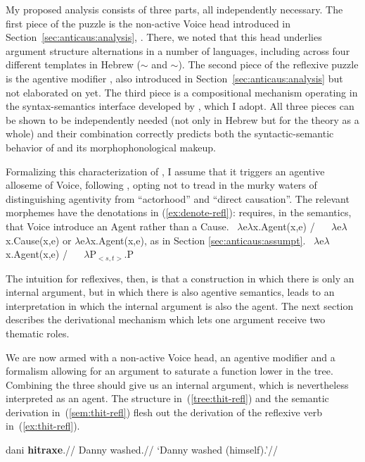 My proposed analysis consists of three parts, all independently necessary. The first piece of the puzzle is the non-active Voice head introduced in Section~\ref{sec:anticaus:analysis}, {\vz}. There, we noted that this head underlies argument structure alternations in a number of languages, including across four different templates in Hebrew ({\tkal}$\sim${\tnif} and {\tpie}$\sim${\thit}). The second piece of the reflexive puzzle is the agentive modifier {\va}, also introduced in Section~\ref{sec:anticaus:analysis} but not elaborated on yet. The third piece is a compositional mechanism operating in the syntax-semantics interface developed by \cite{wood14nllt}, which I adopt. All three pieces can be shown to be independently needed (not only in Hebrew but for the theory as a whole) and their combination correctly predicts both the syntactic-semantic behavior of {\thit} and its morphophonological makeup.


Formalizing this characterization of {\va}, I assume that it triggers an agentive alloseme of Voice, following \cite{doron03,doron14adj}, opting not to tread in the murky waters of distinguishing agentivity from ``actorhood'' and ``direct causation''. The relevant morphemes have the denotations in (\ref{ex:denote-refl}): {\va} requires, in the semantics, that Voice introduce an Agent rather than a Cause.
\pex\label{ex:denote-refl}
	\a {} \lra~$\lambda$e$\lambda$x.Agent(x,e) / \trace~\va
	\a {} \lra~$\lambda$e$\lambda$x.Cause(x,e) or $\lambda$e$\lambda$x.Agent(x,e), as in Section \ref{sec:anticaus:assumpt}.
	\a \denote{\vz} \lra~$\lambda$e$\lambda$x.Agent(x,e) / \trace~\va
	\a \denote{\vz} \lra~$\lambda$P$_{<s,t>}$.P
\xe

The intuition for reflexives, then, is that a construction in which there is only an internal argument, but in which there is also agentive semantics, leads to an interpretation in which the internal argument is also the agent. The next section describes the derivational mechanism which lets one argument receive two thematic roles.


We are now armed with a non-active Voice head, an agentive modifier and a formalism allowing for an argument to saturate a function lower in the tree. Combining the three should give us an internal argument, which is nevertheless interpreted as an agent. The structure in~(\ref{tree:thit-refl}) and the semantic derivation in~(\ref{sem:thit-refl}) flesh out the derivation of the reflexive verb in~(\ref{ex:thit-refl}).

\ex \label{ex:thit-refl}
\begingl
\gla dani \textbf{hitraxe\texttslig}.//
\glb Danny washed.//
\glft `Danny washed (himself).'//
\endgl
\xe

